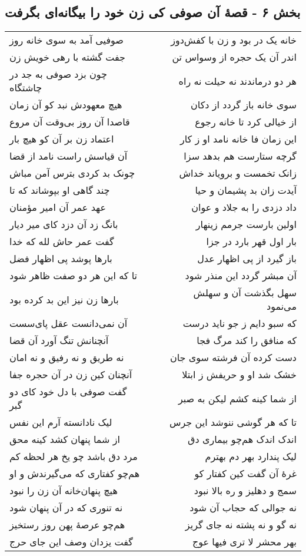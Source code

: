 \begin{center}
\section*{بخش ۶ - قصهٔ آن صوفی کی زن خود را بیگانه‌ای بگرفت}
\label{sec:sh006}
\begin{longtable}{l p{0.5cm} r}
صوفیی آمد به سوی خانه روز
&&
خانه یک در بود و زن با کفش‌دوز
\\
جفت گشته با رهی خویش زن
&&
اندر آن یک حجره از وسواس تن
\\
چون بزد صوفی به جد در چاشتگاه
&&
هر دو درماندند نه حیلت نه راه
\\
هیچ معهودش نبد کو آن زمان
&&
سوی خانه باز گردد از دکان
\\
قاصدا آن روز بی‌وقت آن مروع
&&
از خیالی کرد تا خانه رجوع
\\
اعتماد زن بر آن کو هیچ بار
&&
این زمان فا خانه نامد او ز کار
\\
آن قیاسش راست نامد از قضا
&&
گرچه ستارست هم بدهد سزا
\\
چونک بد کردی بترس آمن مباش
&&
زانک تخمست و برویاند خداش
\\
چند گاهی او بپوشاند که تا
&&
آیدت زان بد پشیمان و حیا
\\
عهد عمر آن امیر مؤمنان
&&
داد دزدی را به جلاد و عوان
\\
بانگ زد آن دزد کای میر دیار
&&
اولین بارست جرمم زینهار
\\
گفت عمر حاش لله که خدا
&&
بار اول قهر بارد در جزا
\\
بارها پوشد پی اظهار فضل
&&
باز گیرد از پی اظهار عدل
\\
تا که این هر دو صفت ظاهر شود
&&
آن مبشر گردد این منذر شود
\\
بارها زن نیز این بد کرده بود
&&
سهل بگذشت آن و سهلش می‌نمود
\\
آن نمی‌دانست عقل پای‌سست
&&
که سبو دایم ز جو ناید درست
\\
آنچنانش تنگ آورد آن قضا
&&
که منافق را کند مرگ فجا
\\
نه طریق و نه رفیق و نه امان
&&
دست کرده آن فرشته سوی جان
\\
آنچنان کین زن در آن حجره جفا
&&
خشک شد او و حریفش ز ابتلا
\\
گفت صوفی با دل خود کای دو گبر
&&
از شما کینه کشم لیکن به صبر
\\
لیک نادانسته آرم این نفس
&&
تا که هر گوشی ننوشد این جرس
\\
از شما پنهان کشد کینه محق
&&
اندک اندک هم‌چو بیماری دق
\\
مرد دق باشد چو یخ هر لحظه کم
&&
لیک پندارد بهر دم بهترم
\\
هم‌چو کفتاری که می‌گیرندش و او
&&
غرهٔ آن گفت کین کفتار کو
\\
هیچ پنهان‌خانه آن زن را نبود
&&
سمج و دهلیز و ره بالا نبود
\\
نه تنوری که در آن پنهان شود
&&
نه جوالی که حجاب آن شود
\\
هم‌چو عرصهٔ پهن روز رستخیز
&&
نه گو و نه پشته نه جای گریز
\\
گفت یزدان وصف این جای حرج
&&
بهر محشر لا تری فیها عوج
\\
\end{longtable}
\end{center}
